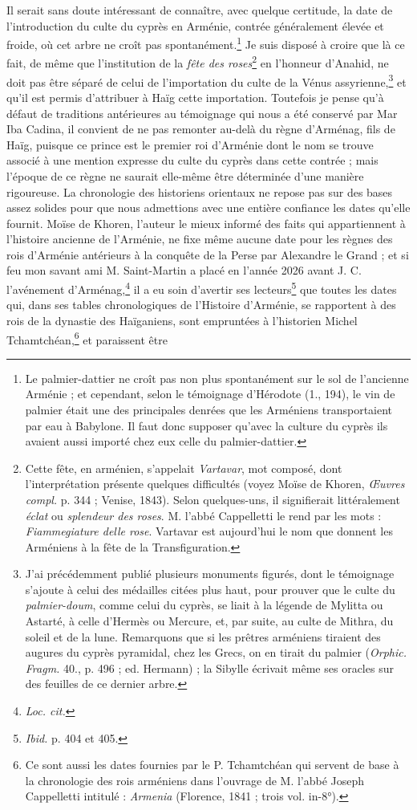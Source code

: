 \documentclass{article}
\begin{document}
Il serait sans doute intéressant de connaître, avec quelque certitude, la date de l'introduction du culte du cyprès en Arménie, contrée généralement élevée et froide, où cet arbre ne croît pas spontanément.\footnote{Le palmier-dattier ne croît pas non plus spontanément sur le sol de l'ancienne Arménie ; et cependant, selon le témoignage d'Hérodote (1., 194), le vin de palmier était une des principales denrées que les Arméniens transportaient par eau à Babylone. Il faut donc supposer qu'avec la culture du cyprès ils avaient aussi importé chez eux celle du palmier-dattier.} Je suis disposé à croire que là ce fait, de même que l'institution de la \emph{fête des roses}\footnote{Cette fête, en arménien, s'appelait \emph{Vartavar}, mot composé, dont l'interprétation présente quelques difficultés (voyez Moïse de Khoren, \emph{Œuvres compl.} p. 344 ; Venise, 1843). Selon quelques-uns, il signifierait littéralement \emph{éclat} ou \emph{splendeur des roses}. M. l'abbé Cappelletti le rend par les mots : \emph{Fiammegiature delle rose}. Vartavar est aujourd'hui le nom que donnent les Arméniens à la fête de la Transfiguration.} en l'honneur d'Anahid, ne doit pas être séparé de celui de l'importation du culte de la Vénus assyrienne,\footnote{J'ai précédemment publié plusieurs monuments figurés, dont le témoignage s'ajoute à celui des médailles citées plus haut, pour prouver que le culte du \emph{palmier-doum}, comme celui du cyprès, se liait à la légende de Mylitta ou Astarté, à celle d'Hermès ou Mercure, et, par suite, au culte de Mithra, du soleil et de la lune. Remarquons que si les prêtres arméniens tiraient des augures du cyprès pyramidal, chez les Grecs, on en tirait du palmier (\emph{Orphic. Fragm.} 40., p. 496 ; ed. Hermann) ; la Sibylle écrivait même ses oracles sur des feuilles de ce dernier arbre.} et qu'il est permis d'attribuer à Haïg cette importation. Toutefois je pense qu'à défaut de traditions antérieures au témoignage qui nous a été conservé par Mar Iba Cadina, il convient de ne pas remonter au-delà du règne d'Arménag, fils de Haïg, puisque ce prince est le premier roi d'Arménie dont le nom se trouve associé à une mention expresse du culte du cyprès dans cette contrée ; mais l'époque de ce règne ne saurait elle-même être déterminée d'une manière rigoureuse. La chronologie des historiens orientaux ne repose pas sur des bases assez solides pour que nous admettions avec une entière confiance les dates qu'elle fournit. Moïse de Khoren, l'auteur le mieux informé des faits qui appartiennent à l'histoire ancienne de l'Arménie, ne fixe même aucune date pour les règnes des rois d'Arménie antérieurs à la conquête de la Perse par Alexandre le Grand ; et si feu mon savant ami M. Saint-Martin a placé en l'année 2026 avant J. C. l'avénement d'Arménag,\footnote{\emph{Loc. cit.}} il a eu soin d'avertir ses lecteurs\footnote{\emph{Ibid.} p. 404 et 405.} que toutes les dates qui, dans ses tables chronologiques de l'Histoire d'Arménie, se rapportent à des rois de la dynastie des Haïganiens, sont empruntées à l'historien Michel Tchamtchéan,\footnote{Ce sont aussi les dates fournies par le P. Tchamtchéan qui servent de base à la chronologie des rois arméniens dans l'ouvrage de M. l'abbé Joseph Cappelletti intitulé : \emph{Armenia} (Florence, 1841 ; trois vol. in-8°).} et paraissent être 
\end{document}
